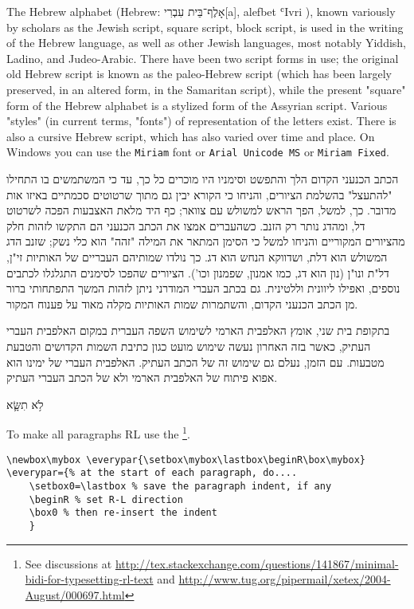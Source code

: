 The Hebrew alphabet (Hebrew: אָלֶף־בֵּית עִבְרִי[a], alefbet ʿIvri ), known variously by scholars as the Jewish script, square script, block script, is used in the writing of the Hebrew language, as well as other Jewish languages, most notably Yiddish, Ladino, and Judeo-Arabic. There have been two script forms in use; the original old Hebrew script is known as the paleo-Hebrew script (which has been largely preserved, in an altered form, in the Samaritan script), while the present "square" form of the Hebrew alphabet is a stylized form of the Assyrian script. Various "styles" (in current terms, "fonts") of representation of the letters exist. There is also a cursive Hebrew script, which has also varied over time and place. On Windows you can use the \texttt{Miriam} font or \texttt{Arial Unicode MS} or \texttt{Miriam Fixed}.
\medskip

\topline
\bgroup
\ifxetex{}\fi
\raggedleft\arial{}\beginR

הכתב הכנעני הקדום הלך והתפשט וסימניו היו מוכרים כל כך, עד כי המשתמשים בו התחילו "להתעצל" בהשלמת הציורים, והניחו כי הקורא יבין גם מתוך שרטוטים סכמתיים באיזו אות מדובר. כך, למשל, הפך הראש למשולש עם צוואר; כף היד מלאת האצבעות הפכה לשרטוט דל, ומהדג נותר רק הזנב. כשהעברים אמצו את הכתב הכנעני הם התקשו לזהות חלק מהציורים המקוריים והניחו למשל כי הסימן המתאר את המילה "זהה" הוא כלי נשק; שזנב הדג המשולש הוא דלת, ושדווקא הנחש הוא דג. כך נולדו שמותיהם העבריים של האותיות זי"ן, דל"ת ונו"ן (נון הוא דג, כמו אמנון, שפמנון וכו'). הציורים שהפכו לסימנים התגלגלו לכתבים נוספים, ואפילו ליוונית וללטינית. גם בכתב העברי המודרני ניתן לזהות המשך התפתחותי ברור מן הכתב הכנעני הקדום, והשתמרות שמות האותיות מקלה מאוד על פענוח המקור.


בתקופת בית שני, אומץ האלפבית הארמי לשימוש השפה העברית במקום האלפבית העברי העתיק, כאשר בזה האחרון נעשה שימוש מועט כגון כתיבת השמות הקדושים והטבעת מטבעות. עם הזמן, נעלם גם שימוש זה של הכתב העתיק. האלפבית העברי של ימינו הוא אפוא פיתוח של האלפבית הארמי ולא של הכתב העברי העתיק.	
{}

 לֹ֥א תִשָּׂ֛א

\endR


\egroup
\bottomline
\medskip

To make all paragraphs  RL use the \cmd{\everypar}\footnote{See discussions at \url{http://tex.stackexchange.com/questions/141867/minimal-bidi-for-typesetting-rl-text} and \url{http://www.tug.org/pipermail/xetex/2004-August/000697.html}}. 

\begin{verbatim}
\newbox\mybox \everypar{\setbox\mybox\lastbox\beginR\box\mybox}
\everypar={% at the start of each paragraph, do....
    \setbox0=\lastbox % save the paragraph indent, if any
    \beginR % set R-L direction
    \box0 % then re-insert the indent
	}
\end{verbatim}

